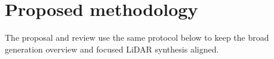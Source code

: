 \section{Proposed methodology}
The proposal and review use the same protocol below to keep the broad
generation overview and focused LiDAR synthesis aligned.




